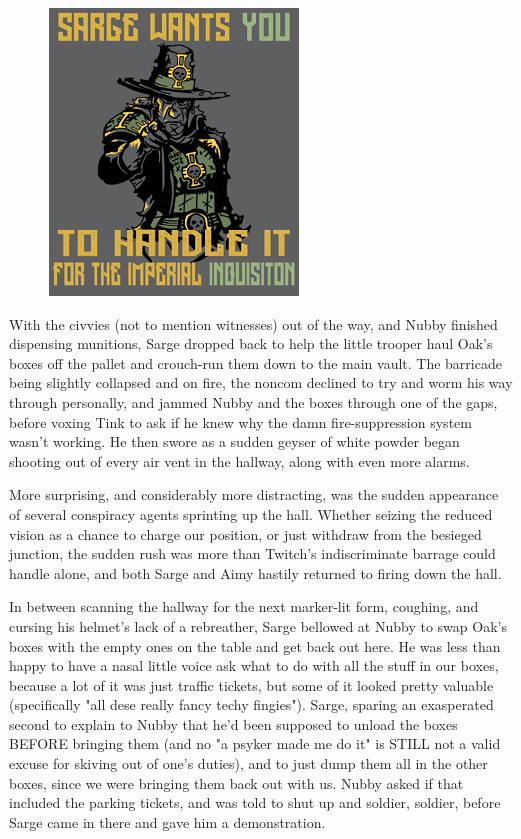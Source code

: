 \begin{figure}
	\begin{center}
		\includegraphics[width=\figwidth]{pics/21/107.png}
	\end{center}
\end{figure}
With the civvies (not to mention witnesses) out of the way, and Nubby finished dispensing munitions, Sarge dropped back to help the little trooper haul Oak's boxes off the pallet and crouch-run them down to the main vault. 
The barricade being slightly collapsed and on fire, the noncom declined to try and worm his way through personally, and jammed Nubby and the boxes through one of the gaps, before voxing Tink to ask if he knew why the damn fire-suppression system wasn't working. 
He then swore as a sudden geyser of white powder began shooting out of every air vent in the hallway, along with even more alarms.

More surprising, and considerably more distracting, was the sudden appearance of several conspiracy agents sprinting up the hall. 
Whether seizing the reduced vision as a chance to charge our position, or just withdraw from the besieged junction, the sudden rush was more than Twitch's indiscriminate barrage could handle alone, and both Sarge and Aimy hastily returned to firing down the hall. 


In between scanning the hallway for the next marker-lit form, coughing, and cursing his helmet's lack of a rebreather, Sarge bellowed at Nubby to swap Oak's boxes with the empty ones on the table and get back out here. 
He was less than happy to have a nasal little voice ask what to do with all the stuff in our boxes, because a lot of it was just traffic tickets, but some of it looked pretty valuable (specifically "all dese really fancy techy fingies"). 
Sarge, sparing an exasperated second to explain to Nubby that he'd been supposed to unload the boxes BEFORE bringing them (and no "a psyker made me do it" is STILL not a valid excuse for skiving out of one's duties), and to just dump them all in the other boxes, since we were bringing them back out with us. 
Nubby asked if that included the parking tickets, and was told to shut up and soldier, soldier, before Sarge came in there and gave him a demonstration.

